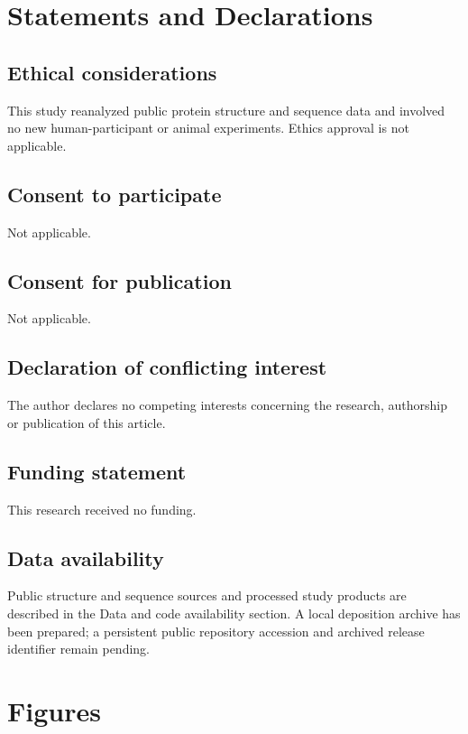 \documentclass[11pt,a4paper]{article}
\begin{document}
\section{Statements and Declarations}

\subsection{Ethical considerations}

This study reanalyzed public protein structure and sequence data and involved no new human-participant or animal experiments. Ethics approval is not applicable.

\subsection{Consent to participate}

Not applicable.

\subsection{Consent for publication}

Not applicable.

\subsection{Declaration of conflicting interest}

The author declares no competing interests concerning the research, authorship or publication of this article.

\subsection{Funding statement}

This research received no funding.

\subsection{Data availability}

Public structure and sequence sources and processed study products are described in the Data and code availability section. A local deposition archive has been prepared; a persistent public repository accession and archived release identifier remain pending.

\clearpage

\section*{Figures}
\end{document}
